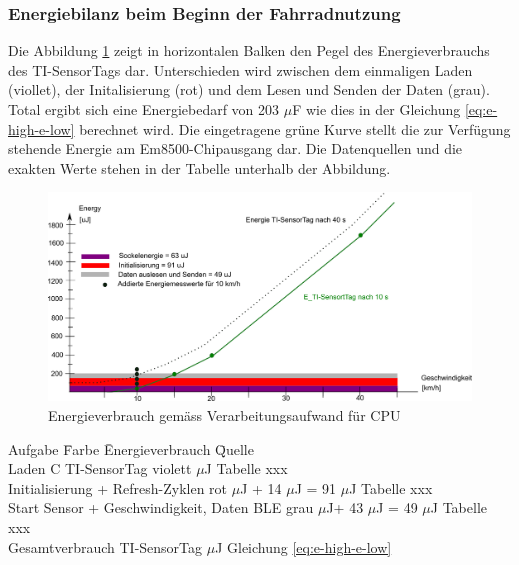 \subsubsection{Energiebilanz beim Beginn der Fahrradnutzung}

Die Abbildung \ref{r_bild_e_zusammenfassung} zeigt in horizontalen Balken den Pegel des Energieverbrauchs des TI-SensorTags dar. Unterschieden wird zwischen dem einmaligen Laden (viollet), der Initalisierung (rot) und dem Lesen und Senden der Daten (grau). Total ergibt sich eine Energiebedarf von 203 $\mu$F wie dies in der Gleichung \ref{eq:e-high-e-low} berechnet wird. Die eingetragene grüne Kurve stellt die zur Verfügung stehende Energie am Em8500-Chipausgang dar. Die Datenquellen und die exakten Werte stehen in der Tabelle unterhalb der Abbildung.

\begin{figure}[ht]
     \includegraphics[width=1\textwidth]{4Resultate/imag/EnergyVerbrauchZusammenfassung.png}
     \caption{Energieverbrauch gem\"{a}ss Verarbeitungsaufwand für CPU}
     \label{r_bild_e_zusammenfassung}
\end{figure}

\begin{minipage}{\textwidth}
    \begin{tabbing}
    Aufgabe \hspace{6 cm} \quad\=  Farbe \quad\= Energieverbrauch \hspace{1cm} \quad\= Quelle \\[0.8ex]
    Laden C TI-SensorTag  \> violett       $\mu$J    \> Tabelle xxx\\
    Initialisierung + Refresh-Zyklen \> rot  $\mu$J + 14 $\mu$J = 91 $\mu$J \> Tabelle xxx\\
    Start Sensor + Geschwindigkeit, Daten BLE\> grau  $\mu$J+ 43 $\mu$J = 49 $\mu$J    \> Tabelle xxx\\
    Gesamtverbrauch TI-SensorTag     \>      $\mu$J    \> Gleichung \ref{eq:e-high-e-low}\\
    \end{tabbing}
\end{minipage}

